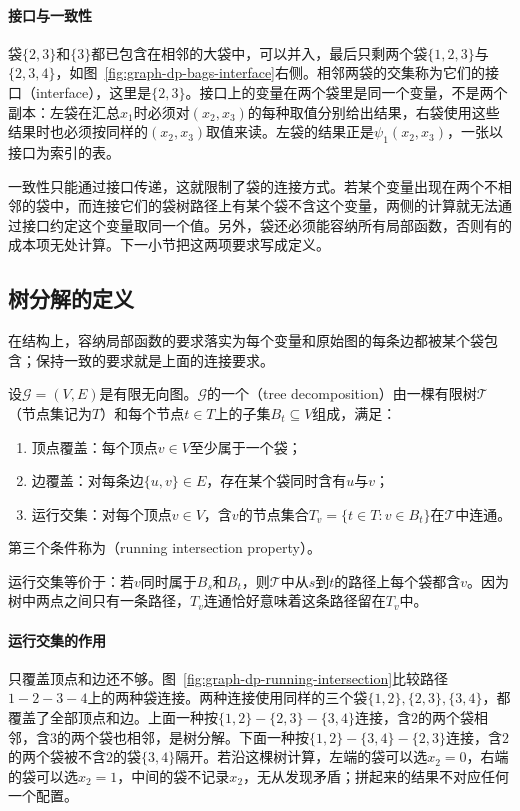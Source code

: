 \paragraph{接口与一致性}
袋$\{2,3\}$和$\{3\}$都已包含在相邻的大袋中，可以并入，最后只剩两个袋$\{1,2,3\}$与$\{2,3,4\}$，如图~\ref{fig:graph-dp-bags-interface}右侧。相邻两袋的交集称为它们的接口（interface），这里是$\{2,3\}$。接口上的变量在两个袋里是同一个变量，不是两个副本：左袋在汇总$x_1$时必须对$(x_2,x_3)$的每种取值分别给出结果，右袋使用这些结果时也必须按同样的$(x_2,x_3)$取值来读。左袋的结果正是$\psi_1(x_2,x_3)$，一张以接口为索引的表。

一致性只能通过接口传递，这就限制了袋的连接方式。若某个变量出现在两个不相邻的袋中，而连接它们的袋树路径上有某个袋不含这个变量，两侧的计算就无法通过接口约定这个变量取同一个值。另外，袋还必须能容纳所有局部函数，否则有的成本项无处计算。下一小节把这两项要求写成定义。

\subsection{树分解的定义}
\label{sec:graph-dp-decomposition-definition}

在结构上，容纳局部函数的要求落实为每个变量和原始图的每条边都被某个袋包含；保持一致的要求就是上面的连接要求。

\begin{definition}[树分解]
\label{def:graph-dp-tree-decomposition}
设$\mathcal G=(V,E)$是有限无向图。$\mathcal G$的一个（tree decomposition）由一棵有限树$\mathcal T$（节点集记为$T$）和每个节点$t\in T$上的子集$B_t\subseteq V$组成，满足：
\begin{enumerate}
  \item 顶点覆盖：每个顶点$v\in V$至少属于一个袋；
  \item 边覆盖：对每条边$\{u,v\}\in E$，存在某个袋同时含有$u$与$v$；
  \item 运行交集：对每个顶点$v\in V$，含$v$的节点集合$T_v=\{t\in T:v\in B_t\}$在$\mathcal T$中连通。
\end{enumerate}
第三个条件称为（running intersection property）。
\end{definition}

运行交集等价于：若$v$同时属于$B_s$和$B_t$，则$\mathcal T$中从$s$到$t$的路径上每个袋都含$v$。因为树中两点之间只有一条路径，$T_v$连通恰好意味着这条路径留在$T_v$中。

\paragraph{运行交集的作用}
只覆盖顶点和边还不够。图~\ref{fig:graph-dp-running-intersection}比较路径$1-2-3-4$上的两种袋连接。两种连接使用同样的三个袋$\{1,2\},\allowbreak\{2,3\},\allowbreak\{3,4\}$，都覆盖了全部顶点和边。上面一种按$\{1,2\}-\{2,3\}-\{3,4\}$连接，含$2$的两个袋相邻，含$3$的两个袋也相邻，是树分解。下面一种按$\{1,2\}-\{3,4\}-\{2,3\}$连接，含$2$的两个袋被不含$2$的袋$\{3,4\}$隔开。若沿这棵树计算，左端的袋可以选$x_2=0$，右端的袋可以选$x_2=1$，中间的袋不记录$x_2$，无从发现矛盾；拼起来的结果不对应任何一个配置。

